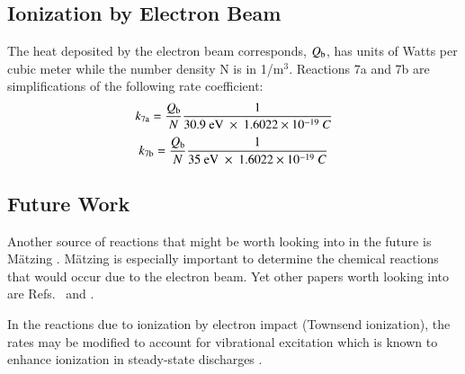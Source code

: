 \documentclass{warpdoc}
\let\citen\cite
\begin{document}
\subsection{Ionization by Electron Beam}

 The heat deposited by the electron beam  corresponds, $Q_{\rm b}$, has units of Watts per cubic meter while the number density N is in 1/m$^3$. Reactions 7a and 7b are simplifications of the following rate coefficient:
%
\begin{equation}
  k_{\rm 7a}=\frac{Q_{\rm b}}{N} \frac{1}{30.9 {\rm ~eV} ~\times~ 1.6022 \times 10^{-19}~C}
\end{equation}
%
%
\begin{equation}
  k_{\rm 7b}=\frac{Q_{\rm b}}{N} \frac{1}{35 {\rm ~eV} ~\times~ 1.6022 \times 10^{-19}~C}
\end{equation}
%




\subsection{Future Work}


Another source of reactions that might be worth looking into in the future is M\"atzing \cite{misc:1991:matzing}. M\"atzing is especially important to determine the
chemical reactions that would occur due to the electron beam.
Yet other papers worth looking into are Refs.\ \citen{misc:2000:bourdon} and \citen{aiaaconf:1999:laux}.


In the reactions due to ionization by electron impact (Townsend ionization), the rates may be modified to account for vibrational excitation which is known to enhance ionization in steady-state discharges \cite{book:1987:mantsakanyan,misc:1978:aleksandrov,misc:1978:son}. 







\end{document}
